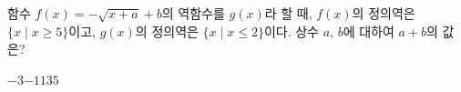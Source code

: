 \hspace*{2mm}\begin{minipage}[t]{\dimexpr\linewidth-2mm\relax}\vspace{0pt}
함수 $f(x)=-\sqrt{x+a}+b$의 역함수를 $g(x)$라 할 때, $f(x)$의 정의역은 $\{x\mid x\ge 5\}$이고, $g(x)$의 정의역은 $\{x\mid x\le 2\}$이다. 상수 $a$, $b$에 대하여 $a+b$의 값은?
\begin{choices32}{$-3$}{$-1$}{$1$}{$3$}{$5$}\end{choices32}\end{minipage}
